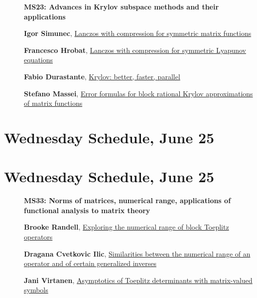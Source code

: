 \documentclass[ILAS2025-program.tex]{subfiles}
\begin{document}
    \begin{description}
    \item[] {\color{mstitle}\textbf{MS23: Advances in Krylov subspace methods and their applications}} 
    \item[] \hypertarget{up0237}{}\textbf{Igor Simunec}, \hyperlink{down0237}{Lanczos with compression for symmetric matrix functions}
        \item[] \hypertarget{up0238}{}\textbf{Francesco Hrobat}, \hyperlink{down0238}{Lanczos with compression for symmetric Lyapunov equations}
        \item[] \hypertarget{up0239}{}\textbf{Fabio Durastante}, \hyperlink{down0239}{Krylov: better, faster, parallel}
        \item[] \hypertarget{up0240}{}\textbf{Stefano Massei}, \hyperlink{down0240}{Error formulas for block rational Krylov approximations of matrix functions}
        \end{description}
    \newpage

\section*{Wednesday Schedule, June 25 }
        
        \newpage

\section*{Wednesday Schedule, June 25 }
        
        \begin{description}
    \item[] {\color{mstitle}\textbf{MS33: Norms of matrices, numerical range, applications of functional analysis to matrix theory}} 
    \item[] \hypertarget{up0244}{}\textbf{Brooke Randell}, \hyperlink{down0244}{Exploring the numerical range of block Toeplitz operators}
        \item[] \hypertarget{up0245}{}\textbf{Dragana Cvetkovic Ilic}, \hyperlink{down0245}{Similarities between the numerical range of an operator and of certain generalized inverses}
        \item[] \hypertarget{up0246}{}\textbf{Jani Virtanen}, \hyperlink{down0246}{Asymptotics of Toeplitz determinants with matrix-valued symbols
}
        \end{description}
    \newpage
\end{document}
